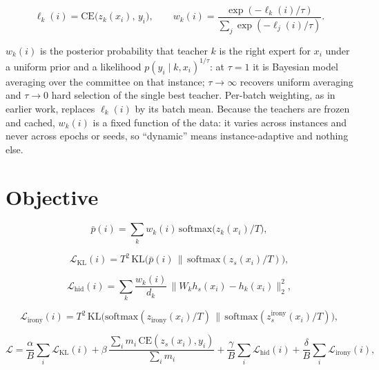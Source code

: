 \begin{equation}
\ell_k(i) = \mathrm{CE}\big(z_k(x_i),\, y_i\big), \qquad
w_k(i) = \frac{\exp(-\ell_k(i)/\tau)}{\sum_{j} \exp(-\ell_j(i)/\tau)} .
\end{equation}

$w_k(i)$ is the posterior probability that teacher $k$ is the right expert for $x_i$ under a uniform
prior and a likelihood $p(y_i \mid k, x_i)^{1/\tau}$: at $\tau = 1$ it is Bayesian model averaging
over the committee on that instance; $\tau \to \infty$ recovers uniform averaging and $\tau \to 0$
hard selection of the single best teacher. Per-batch weighting, as in earlier work, replaces
$\ell_k(i)$ by its batch mean. Because the teachers are frozen and cached, $w_k(i)$ is a fixed
function of the data: it varies across instances and never across epochs or seeds, so ``dynamic''
means instance-adaptive and nothing else.
\section{Objective}
\label{sec:3.3}
\begin{equation}
\bar p(i) = \sum_k w_k(i)\, \mathrm{softmax}\!\big(z_k(x_i)/T\big),
\end{equation}

\begin{equation}
\mathcal{L}_{\mathrm{KL}}(i) = T^2\, \mathrm{KL}\!\big(\bar p(i)\,\|\,\mathrm{softmax}(z_s(x_i)/T)\big),
\end{equation}

\begin{equation}
\mathcal{L}_{\mathrm{hid}}(i) = \sum_k \frac{w_k(i)}{d_k}\, \big\| W_k h_s(x_i) - h_k(x_i) \big\|_2^2,
\end{equation}

\begin{equation}
\mathcal{L}_{\mathrm{irony}}(i) = T^2\, \mathrm{KL}\!\big(\mathrm{softmax}(z_{\text{irony}}(x_i)/T)\,\|\,\mathrm{softmax}(z_s^{\text{irony}}(x_i)/T)\big),
\end{equation}

\begin{equation}
\mathcal{L} = \frac{\alpha}{B}\sum_i \mathcal{L}_{\mathrm{KL}}(i)
 + \beta\, \frac{\sum_i m_i\, \mathrm{CE}(z_s(x_i), y_i)}{\sum_i m_i}
 + \frac{\gamma}{B}\sum_i \mathcal{L}_{\mathrm{hid}}(i) + \frac{\delta}{B}\sum_i \mathcal{L}_{\mathrm{irony}}(i),
\end{equation}

